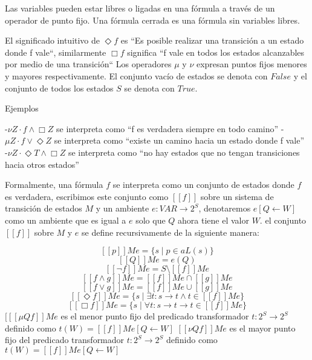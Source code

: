 Las variables pueden estar libres o ligadas en una fórmula a través de un operador de punto fijo. Una fórmula cerrada es una fórmula sin variables libres.

El significado intuitivo de $\Diamond f$ es “Es posible realizar una transición a un estado donde f vale“, similarmente $\Box f$ significa “f vale en todos los estados alcanzables por medio de una transición“
Los operadores $\mu$ y $\nu$ expresan puntos fijos menores y mayores respectivamente. El conjunto vacío de estados se denota con $False$ y el conjunto de todos los estados $S$ se denota con $True$.

Ejemplos

-$\nu Z \cdot f \land \Box Z$ se interpreta como “f es verdadera siempre en todo camino”
-$\mu Z \cdot f \lor \Diamond Z$ se interpreta como “existe un camino hacia un estado donde f vale”
-$\nu Z \cdot \Diamond T \land \Box Z$ se interpreta como “no hay estados que no tengan transiciones hacia otros estados”

Formalmente, una fórmula $f$ se interpreta como un conjunto de estados donde $f$ es verdadera, escribimos este conjunto como $[[f]]$ sobre un sistema de transición de estados $M$ y un ambiente $e: VAR \to 2^{S}$, denotaremos $e[Q \gets W]$ como un ambiente que es igual a $e$ solo que $Q$ ahora tiene el valor $W$. el conjunto $[[f]]$ sobre $M$ y $e$ se define recursivamente de la siguiente manera:

\[ [[p]] M e = \{s \mid p \in a L(s)\} \] 
\[ [[Q]] M e = e(Q) \]
\[ [[\neg f]] M e = S \setminus [[f]] M e \]
\[ [[f \land g]] M e = [[f]] M e \cap [[g]] M e \]
\[ [[f \lor g]] M e = [[f]] M e \cup [[g]] M e \]
\[ [[\Diamond f]] M e = \{s \mid \exists t : s \to t \land t \in [[f]] M e\} \]
\[ [[\Box f]] M e = \{s \mid \forall t : s \to t  \rightarrow t \in [[f]] M e\} \]
$[[[\mu Q f]] M e$ es el menor punto fijo del predicado transformador $t:2^{S} \to 2^{S}$ definido como $t(W) = [[f]] M e[Q \gets W] $
$ [[\nu Q f]] M e$ es el mayor punto fijo del predicado transformador $t:2^{S} \to 2^{S}$ definido como $t(W) = [[f]] M e[Q \gets W] $
